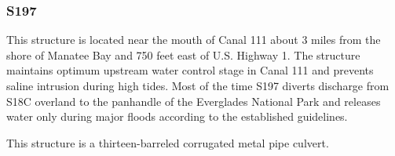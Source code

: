 %
%




\clearpage
\subsubsection{S197}
This structure is located near the mouth of Canal 111 about 3 miles from the shore of Manatee Bay and 750 feet east of U.S. Highway 1. The structure maintains optimum upstream water control stage in Canal 111 and prevents saline intrusion during high tides. Most of the time S197 diverts discharge from S18C overland to the panhandle of the Everglades National Park and releases water only during major floods according to the established guidelines.

This structure is a thirteen-barreled corrugated metal pipe culvert.

